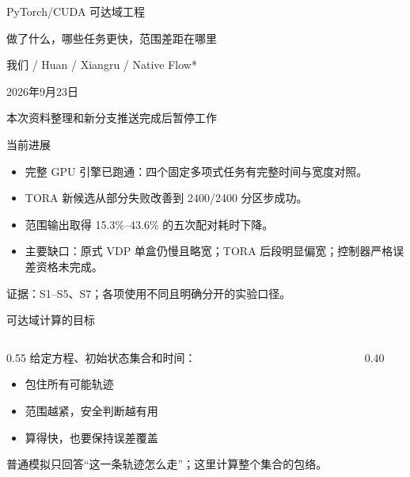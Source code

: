 \documentclass[UTF8,fontset=fandol,aspectratio=169,10pt]{ctexbeamer}
\begin{document}
\begin{frame}{PyTorch/\allowbreak{}CUDA 可达域工程}
\vspace{0.5cm}{\LARGE 阶段进展与实验对照}\par\vspace{0.6cm}
{\large 做了什么，哪些任务更快，范围差距在哪里}\par\vspace{0.8cm}
我们 / Huan / Xiangru / Native Flow*\par
\vspace{0.3cm}2026年9月23日\par
\vfill\color{teal}本次资料整理和新分支推送完成后暂停工作
\end{frame}
\begin{frame}{当前进展}
\begin{itemize}
\item 完整 GPU 引擎已跑通：四个固定多项式任务有完整时间与宽度对照。
\item TORA 新候选从部分失败改善到 2400/\allowbreak{}2400 分区步成功。
\item 范围输出取得 15.3\%–43.6\% 的五次配对耗时下降。
\item 主要缺口：原式 VDP 单盒仍慢且略宽；TORA 后段明显偏宽；控制器严格误差资格未完成。
\end{itemize}\par\vfill{\fontsize{6.5}{8}\selectfont\color{gray}证据：S1–S5、S7；各项使用不同且明确分开的实验口径。} 
\end{frame}
\begin{frame}{可达域计算的目标}
\begin{columns}[T]
\begin{column}{0.55\textwidth}
给定方程、初始状态集合和时间：
\begin{itemize}
\item 包住所有可能轨迹
\item 范围越紧，安全判断越有用
\item 算得快，也要保持误差覆盖
\end{itemize}
\vspace{0.3cm}普通模拟只回答“这一条轨迹怎么走”；这里计算整个集合的包络。
\end{column}
\begin{column}{0.40\textwidth}
\end{column}\end{columns}
\end{frame}
\end{document}
